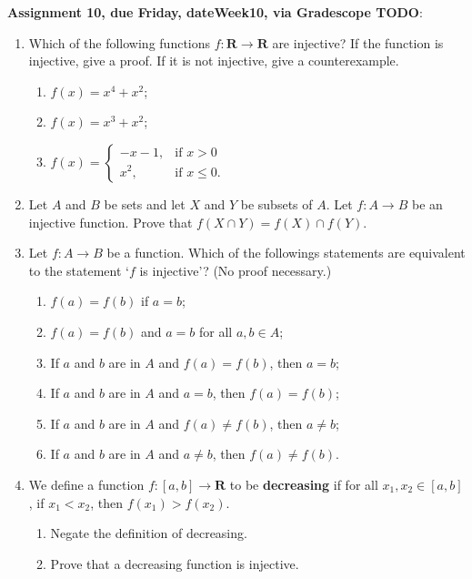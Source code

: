 \documentclass[12pt]{article}
\begin{document}
\noindent \textbf{Assignment 10, due Friday, \csname dateWeek10\endcsname, via Gradescope TODO}:
\begin{enumerate}
\item Which of the following functions $f \colon \mathbf{R}\to \mathbf{R}$ are injective? If the function is injective, give a proof. If it is not injective, give a counterexample.
 \begin{enumerate}
 \item $f(x) = x^4 + x^2$;
 \item $f(x) = x^3 + x^2$;
 \item $f(x) =
 \begin{cases}
 -x-1, & \text{if $x > 0$} \\
 x^2, & \text{if $x \leq 0$}.
 \end{cases}
 $ 
 \end{enumerate}
\item Let $A$ and $B$ be sets and let $X$ and $Y$ be subsets of $A$. Let $f \colon A \to B$ be an injective function. Prove that $f(X \cap Y) = f(X) \cap f(Y)$.
\item Let $f \colon A \to B$ be a function. Which of the followings statements are equivalent to the statement `$f$ is injective'? (No proof necessary.)
 \begin{enumerate}
 \item $f(a) = f(b)$ if $a = b$;
 \item $f(a) = f(b)$ and $a = b$ for all $a,b \in A$;
 \item If $a$ and $b$ are in $A$ and $f(a) = f(b)$, then $a = b$;
 \item If $a$ and $b$ are in $A$ and $a = b$, then $f(a) = f(b)$;
 \item If $a$ and $b$ are in $A$ and $f(a) \neq f(b)$, then $a \neq b$;
 \item If $a$ and $b$ are in $A$ and $a \neq b$, then $f(a) \neq f(b)$. 
 \end{enumerate}
\item We define a function $f\colon [a,b] \to \mathbf{R}$ to be \textbf{decreasing} if for all $x_1,x_2 \in [a,b]$, if $x_1 < x_2$, then $f(x_1) > f(x_2)$.
 \begin{enumerate}
 \item Negate the definition of decreasing.
 \item Prove that a decreasing function is injective.
 \end{enumerate}
\end{enumerate}

\newpage
\end{document}
